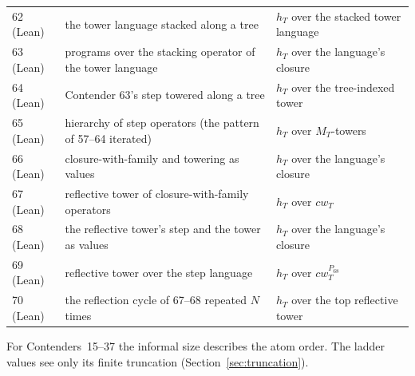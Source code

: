 \documentclass[11pt]{article}
\theoremstyle{definition}
\theoremstyle{remark}
\begin{document}
\begin{center}
\begin{tabular}{lll}
62 (Lean) & the tower language stacked along a tree & $h_T$ over the stacked tower language\\
63 (Lean) & programs over the stacking operator of the tower language & $h_T$ over the language's closure\\
64 (Lean) & Contender 63's step towered along a tree & $h_T$ over the tree-indexed tower\\
65 (Lean) & hierarchy of step operators (the pattern of 57--64 iterated) & $h_T$ over $M_T$-towers\\
66 (Lean) & closure-with-family and towering as values & $h_T$ over the language's closure\\
67 (Lean) & reflective tower of closure-with-family operators & $h_T$ over $cw_T$\\
68 (Lean) & the reflective tower's step and the tower as values & $h_T$ over the language's closure\\
69 (Lean) & reflective tower over the step language & $h_T$ over $cw^{P_{68}}_T$\\
70 (Lean) & the reflection cycle of 67--68 repeated $N$ times & $h_T$ over the top reflective tower\\
\bottomrule
\end{tabular}
\end{center}

For Contenders~15--37 the informal size describes the atom order. The ladder
values see only its finite truncation (Section~\ref{sec:truncation}).
\end{document}

